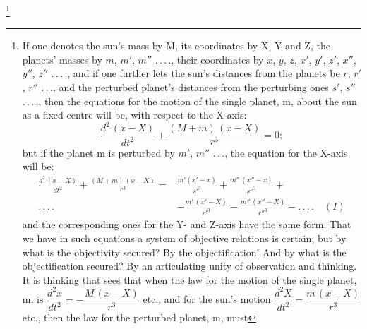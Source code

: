 \documentclass[12pt,a4paper]{book}
\begin{document}
\footnote{%
If one denotes the sun's mass by M, its coordinates by X, Y and Z, the planets' masses by $m$, $m'$,
$m''$ .\,.\,.\,., their coordinates
by $x$, $y$, $z$, $x'$, $y'$, $z'$, $x''$, $y''$, $z''$ .\,.\,.\,., and if one further lets the sun's
distances from the planets be $r$, $r'$, $r''$ .\,.\,., and the perturbed planet's distances from the
perturbing ones $s'$, $s''$ .\,.\,.\,., then the equations for the motion of the single planet, m, about
the sun as a fixed
centre will be, with respect to the X-axis:
\[
\frac{d^{2}\,(x - X)}{dt^{2}} + \frac{(M + m)\,(x - X)}{r^{3}} = 0;
\]
but if the planet m is perturbed by $m'$, $m''$ .\,.\,., the equation for the X-axis will be:
\begin{align*}
\frac{d^{2}\,(x - X)}{dt^{2}} + \frac{(M + m)\,(x - X)}{r^{3}}
  = {}& \frac{m'(x' - x)}{{s'}^{3}} + \frac{m''\,(x'' - x)}{{s''}^{3}} + \\
.\,.\,.\,. {}& - \frac{m'\,(x' - X)}{{r'}^{3}}
        - \frac{m''\,(x'' - X)}{{r''}^{3}} - .\,.\,.\,. \quad (I)
\end{align*}
and the corresponding ones for the Y- and Z-axis have the same form. That we have in such equations a
system of objective relations is certain; but by what is the objectivity secured? By the objectification!
And by what is the objectification secured? By an articulating unity of observation and thinking. It is
thinking that sees that when the law for the motion of the single planet, m, is
$\dfrac{d^{2}x}{dt^{2}} = - \dfrac{M\,(x - X)}{r^{3}}$ etc., and for the sun's motion
$\dfrac{d^{2}X}{dt^{2}} = \dfrac{m\,(x - X)}{r^{3}}$ etc., then the law for the perturbed planet, m, must
}
\end{document}
